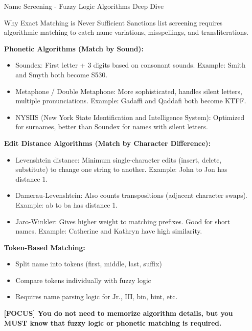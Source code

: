 \documentclass[11pt,a4paper]{beamer}
\newcommand{\examfocus}[1]{\textcolor{orange!80!black}{\textbf{[FOCUS] #1}}}
\begin{document}
	\begin{frame}{Name Screening - Fuzzy Logic Algorithms Deep Dive}
		\begin{block}{Why Exact Matching is Never Sufficient}
			Sanctions list screening requires algorithmic matching to catch name variations, misspellings, and transliterations.
		\end{block}
		
		\textbf{Phonetic Algorithms (Match by Sound):}
		\begin{itemize}
			\item Soundex: First letter + 3 digits based on consonant sounds. Example: Smith and Smyth both become S530.
			\item Metaphone / Double Metaphone: More sophisticated, handles silent letters, multiple pronunciations. Example: Gadaffi and Qaddafi both become KTFF.
			\item NYSIIS (New York State Identification and Intelligence System): Optimized for surnames, better than Soundex for names with silent letters.
		\end{itemize}
		
		\textbf{Edit Distance Algorithms (Match by Character Difference):}
		\begin{itemize}
			\item Levenshtein distance: Minimum single-character edits (insert, delete, substitute) to change one string to another. Example: John to Jon has distance 1.
			\item Damerau-Levenshtein: Also counts transpositions (adjacent character swaps). Example: ab to ba has distance 1.
			\item Jaro-Winkler: Gives higher weight to matching prefixes. Good for short names. Example: Catherine and Kathryn have high similarity.
		\end{itemize}
		
		\textbf{Token-Based Matching:}
		\begin{itemize}
			\item Split name into tokens (first, middle, last, suffix)
			\item Compare tokens individually with fuzzy logic
			\item Requires name parsing logic for Jr., III, bin, bint, etc.
		\end{itemize}
		
		\examfocus{You do not need to memorize algorithm details, but you MUST know that fuzzy logic or phonetic matching is required.}
	\end{frame}
	
\end{document}
